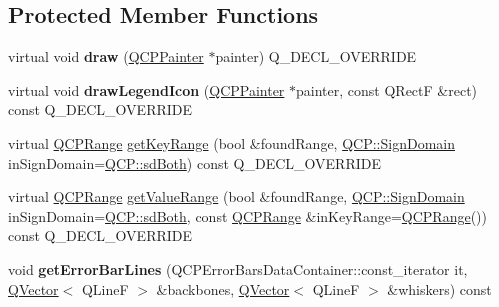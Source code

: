 \subsection*{Protected Member Functions}
\begin{DoxyCompactItemize}
\item 
\mbox{\label{class_q_c_p_error_bars_a801e85931372abf2a1034bfb2eac5cd2}} 
virtual void {\bfseries draw} (\hyperlink{class_q_c_p_painter}{Q\+C\+P\+Painter} $\ast$painter) Q\+\_\+\+D\+E\+C\+L\+\_\+\+O\+V\+E\+R\+R\+I\+DE
\item 
\mbox{\label{class_q_c_p_error_bars_a20f5d292e66103f26bca00b11ce417b4}} 
virtual void {\bfseries draw\+Legend\+Icon} (\hyperlink{class_q_c_p_painter}{Q\+C\+P\+Painter} $\ast$painter, const Q\+RectF \&rect) const Q\+\_\+\+D\+E\+C\+L\+\_\+\+O\+V\+E\+R\+R\+I\+DE
\item 
virtual \hyperlink{class_q_c_p_range}{Q\+C\+P\+Range} \hyperlink{class_q_c_p_error_bars_a6cac828a430d66ac77a167549d01d212}{get\+Key\+Range} (bool \&found\+Range, \hyperlink{namespace_q_c_p_afd50e7cf431af385614987d8553ff8a9}{Q\+C\+P\+::\+Sign\+Domain} in\+Sign\+Domain=\hyperlink{namespace_q_c_p_afd50e7cf431af385614987d8553ff8a9a3dee7e9cd2fedce9253b83e172626a6c}{Q\+C\+P\+::sd\+Both}) const Q\+\_\+\+D\+E\+C\+L\+\_\+\+O\+V\+E\+R\+R\+I\+DE
\item 
virtual \hyperlink{class_q_c_p_range}{Q\+C\+P\+Range} \hyperlink{class_q_c_p_error_bars_ab76215a186ae4862235821e028685f26}{get\+Value\+Range} (bool \&found\+Range, \hyperlink{namespace_q_c_p_afd50e7cf431af385614987d8553ff8a9}{Q\+C\+P\+::\+Sign\+Domain} in\+Sign\+Domain=\hyperlink{namespace_q_c_p_afd50e7cf431af385614987d8553ff8a9a3dee7e9cd2fedce9253b83e172626a6c}{Q\+C\+P\+::sd\+Both}, const \hyperlink{class_q_c_p_range}{Q\+C\+P\+Range} \&in\+Key\+Range=\hyperlink{class_q_c_p_range}{Q\+C\+P\+Range}()) const Q\+\_\+\+D\+E\+C\+L\+\_\+\+O\+V\+E\+R\+R\+I\+DE
\item 
\mbox{\label{class_q_c_p_error_bars_abeea5ff0d66732bbfc9b74869d8c552e}} 
void {\bfseries get\+Error\+Bar\+Lines} (Q\+C\+P\+Error\+Bars\+Data\+Container\+::const\+\_\+iterator it, \hyperlink{class_q_vector}{Q\+Vector}$<$ Q\+LineF $>$ \&backbones, \hyperlink{class_q_vector}{Q\+Vector}$<$ Q\+LineF $>$ \&whiskers) const
\item 
\mbox{\label{class_q_c_p_error_bars_aac9ffa98815035d300b2e9a67495ba4c}} 

\end{DoxyCompactItemize}
